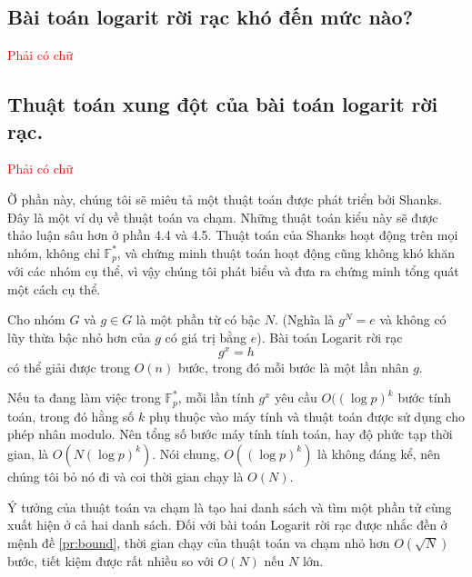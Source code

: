 \subsection{Bài toán logarit rời rạc khó đến mức nào?}
\textcolor{red}{Phải có chữ}

\subsection{Thuật toán xung đột của bài toán logarit rời rạc.}
\textcolor{red}{Phải có chữ}

Ờ phần này, chúng tôi sẽ miêu tả một thuật toán được phát triển bởi Shanks. Đây là một ví dụ về thuật toán va chạm.
Những thuật toán kiểu này sẽ được thảo luận sâu hơn ở phần 4.4 và 4.5. Thuật toán của Shanks hoạt động trên mọi nhóm, không chỉ $\mathbb{F}_p^*$,
và chứng minh thuật toán hoạt động cũng không khó khăn với các nhóm cụ thể, vì vậy chúng tôi phát biểu và đưa ra chứng minh tổng quát một cách cụ thể.

\begin{proposition}
	\label{pr:bound}
	Cho nhóm $G$ và $g \in G$ là một phần từ có bậc $N$. (Nghĩa là $g^N = e$ và không có lũy thừa bậc nhỏ hơn của $g$ có giá trị bằng $e$).
	Bài toán Logarit rời rạc
	\begin{equation}
		\label{eq:collision}
		g^x =h
	\end{equation}
	có thể giải được trong $O(n)$ bước, trong đó mỗi bước là một lần nhân $g$.
\end{proposition}


\begin{remark}
	Nếu ta đang làm việc trong $\mathbb{F}^*_p$, mỗi lần tính $g^x$ yêu cầu $O((\log p) ^k$ bước tính toán, trong đó hằng số $k$ phụ thuộc
	vào máy tính và thuật toán được sử dụng cho phép nhân modulo. Nên tổng số bước máy tính tính toán, hay độ phức tạp thời gian, là $O(N (\log p)^k)$.
	Nói chung, $O((\log p)^k)$ là không đáng kể, nên chúng tôi bỏ nó đi và coi thời gian chạy là $O(N)$.
\end{remark}
Ý tưởng của thuật toán va chạm là tạo hai danh sách và tìm một phần tử cùng xuất hiện ở cả hai danh sách. Đối với bài toán Logarit rời rạc được nhắc đền ở mệnh đề \ref{pr:bound},
thời gian chạy của thuật toán va chạm nhỏ hơn $O(\sqrt{N})$ bước, tiết kiệm được rất nhiều so với $O(N)$ nếu $N$ lớn.


